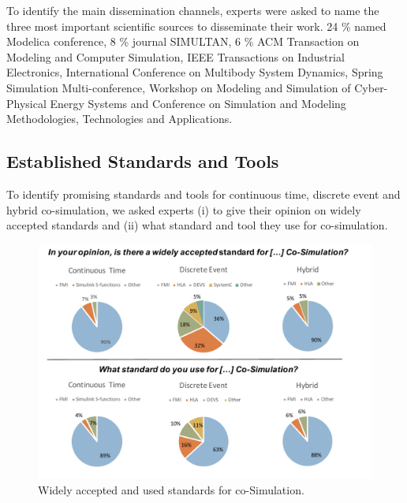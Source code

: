 To identify the main dissemination channels, experts were asked to name the three most important scientific sources to disseminate their work. 
24 \% named Modelica conference, 8 \% journal SIMULTAN, 6 \% ACM Transaction on Modeling and Computer Simulation, IEEE Transactions on Industrial Electronics, International Conference on Multibody System Dynamics, Spring Simulation Multi-conference, Workshop on Modeling and Simulation of Cyber-Physical Energy Systems and Conference on Simulation and Modeling Methodologies, Technologies and Applications.

\subsection{Established Standards and Tools}
To identify promising standards and tools for continuous time, discrete event and hybrid co-simulation, we asked experts (i) to give their opinion on widely accepted standards and (ii) what standard and tool they use for co-simulation. 

\begin{figure}[h!]
\centering
\includegraphics[width=1\textwidth]{Figures/Tools.pdf}
\caption{Widely accepted and used standards for co-Simulation. }
\label{fig:Standards}
\end{figure}


